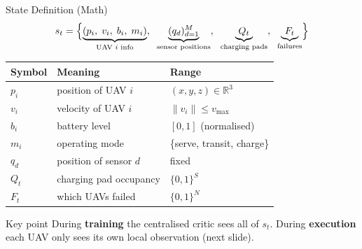 \documentclass[aspectratio=169,12pt]{beamer}
\begin{document}
\begin{frame}{State Definition (Math)}
\[
s_t = \Bigl\{
  \underbrace{(p_i,\; v_i,\; b_i,\; m_i)}_{\text{UAV $i$ info}},
  \;\;
  \underbrace{(q_d)_{d=1}^{M}}_{\text{sensor positions}},
  \;\;
  \underbrace{Q_t}_{\text{charging pads}},
  \;\;
  \underbrace{F_t}_{\text{failures}}
\Bigr\}
\]

\vspace{0.5em}
\begin{center}
\begin{tabular}{@{}lll@{}}
\toprule
\textbf{Symbol} & \textbf{Meaning} & \textbf{Range} \\
\midrule
$p_i$ & position of UAV $i$ & $(x,y,z) \in \mathbb{R}^3$ \\
$v_i$ & velocity of UAV $i$ & $\|v_i\| \le v_{\max}$ \\
$b_i$ & battery level & $[0, 1]$ (normalised) \\
$m_i$ & operating mode & \{serve, transit, charge\} \\
$q_d$ & position of sensor $d$ & fixed \\
$Q_t$ & charging pad occupancy & $\{0,1\}^S$ \\
$F_t$ & which UAVs failed & $\{0,1\}^N$ \\
\bottomrule
\end{tabular}
\end{center}

\vspace{0.4em}
\begin{block}{Key point}
During \textbf{training} the centralised critic sees all of $s_t$.
During \textbf{execution} each UAV only sees its own local observation (next slide).
\end{block}
\end{frame}

\end{document}
